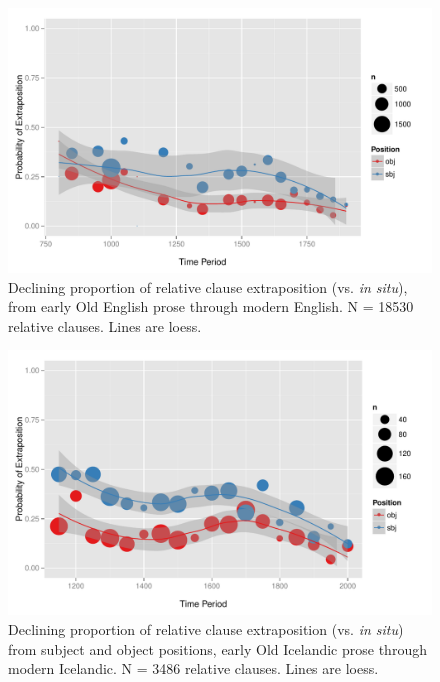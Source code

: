 \begin{figure}

  \includegraphics[width=1.1\textwidth]{stableVarTalks/exSbjObjYearBinned50Loessymeb.pdf}
\caption{Declining proportion of relative clause extraposition (vs. \textsl{in situ}), from early Old English prose through modern English. N = 18530 relative clauses. Lines are loess.}
\label{engfig}       %
\end{figure}

\begin{figure}

  \includegraphics[width=1.1\textwidth]{stableVarTalks/exSbjObjYearBinned50Loessice.pdf}
\caption{Declining proportion of relative clause extraposition (vs. \textsl{in situ}) from subject and object positions, early Old Icelandic prose through modern Icelandic. N = 3486 relative clauses. Lines are loess.}
\label{icefig}       
\end{figure}

